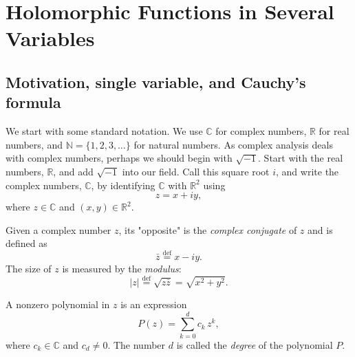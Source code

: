 \documentclass{book}
\newcommand{\C}{\mathbb{C}}
\newcommand{\R}{\mathbb{R}}
\newcommand{\N}{\mathbb{N}}
\newcommand{\abs}[1]{\lvert #1 \rvert}
\begin{document}
\chapter{Holomorphic Functions in Several Variables}
\section{Motivation, single variable, and Cauchy's formula}\label{sec:motivation}

We start with some standard notation. We use $\C$ for complex numbers,
$\R$ for real numbers, and $\N = \{1,2,3,\ldots\}$ for natural numbers.
As complex analysis deals with complex numbers, perhaps we should begin with
$\sqrt{-1}$. Start with the real numbers, $\R$, and add $\sqrt{-1}$ into our
field. Call this square root $i$, and write the complex numbers, $\C$, by
identifying $\C$ with $\R^2$ using
\begin{equation*}
z = x + iy,
\end{equation*}
where $z \in \C$ and $(x,y) \in \R^2$.

Given a complex number $z$, its "opposite" is the \emph{complex conjugate}
of $z$ and is defined as
\begin{equation*}
\bar{z} \overset{\text{def}}{=} x - iy.
\end{equation*}
The size of $z$ is measured by the \emph{modulus}:
\begin{equation*}
\abs{z} \overset{\text{def}}{=} \sqrt{z \bar{z}} = \sqrt{x^2 + y^2}.
\end{equation*}

A nonzero polynomial in $z$ is an expression
\begin{equation*}
P(z) = \sum_{k=0}^d c_k\,z^k,
\end{equation*}
where $c_k \in \C$ and $c_d \neq 0$. The number $d$ is called the
\emph{degree} of the polynomial $P$.
\end{document}
